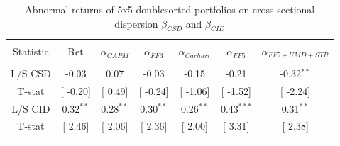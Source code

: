 \documentclass[16pt]{article}
\begin{document}
\begin{table}[!htbp] \centering 
  \caption{Abnormal returns of 5x5 doublesorted portfolios on cross-sectional dispersion $\beta_{CSD}$ and $\beta_{CID}$} 
  \label{} 
\begin{tabular}{@{\extracolsep{5pt}} ccccccc} 
\\[-1.8ex]\hline 
\hline \\[-1.8ex] 
Statistic & Ret & $\alpha_{CAPM}$ & $\alpha_{FF3}$ & $\alpha_{Carhart}$ & $\alpha_{FF5}$ & $\alpha_{FF5+UMD+STR}$ \\  
\hline \\[-1.8ex] 
L/S CSD & -0.03 & 0.07 & -0.03 & -0.15 & -0.21 & -0.32$^{**}$ \\ 
T-stat & [ -0.20] & [ 0.49] & [ -0.24] & [ -1.06] & [ -1.52] & [ -2.24] \\ 
L/S CID & 0.32$^{**}$ & 0.28$^{**}$ & 0.30$^{**}$ & 0.26$^{**}$ & 0.43$^{***}$ & 0.31$^{**}$ \\ 
T-stat & [ 2.46] & [ 2.06] & [ 2.36] & [ 2.00] & [ 3.31] & [ 2.38] \\ 
\hline \\[-1.8ex] 
\end{tabular} 
\end{table}


\clearpage
\end{document}
